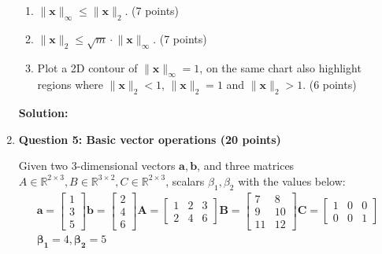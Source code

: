 \documentclass[11pt,letterpaper]{article}
\begin{document}
\begin{enumerate}
\begin{enumerate}
    \item $\lVert \mathbf{x} \rVert_\infty \le \lVert \mathbf{x} \rVert_2$. (7 points)
    \item $\lVert \mathbf{x} \rVert_2 \le \sqrt{m} \cdot \lVert \mathbf{x} \rVert_\infty$. (7 points)
    \item Plot a 2D contour of $\lVert \mathbf{x} \rVert_\infty = 1$, on the same chart also highlight regions where $\lVert \mathbf{x}\rVert_2  < 1$, $\lVert \mathbf{x}\rVert_2  = 1$ and $\lVert \mathbf{x}\rVert_2  > 1$. (6 points)
\end{enumerate}

\textbf{Solution:}

\clearpage
\item[] \textbf{Question 5: Basic vector operations (20 points)} 

Given two 3-dimensional vectors $\mathbf{a}, \mathbf{b}$, and three matrices $A \in \mathbb{R}^{2 \times 3}, B \in \mathbb{R}^{3 \times 2}, C \in \mathbb{R}^{2 \times 3}$, scalars $\beta_1, \beta_2$ with the values below:\\

\begin{gather*}
    \mathbf{a} = \begin{bmatrix} 1 \\ 3 \\ 5 \end{bmatrix} 
    \mathbf{b} = \begin{bmatrix} 2 \\ 4 \\ 6 \end{bmatrix} 
    \mathbf{A} = \begin{bmatrix} 1 & 2 & 3 \\ 2 & 4 & 6 \end{bmatrix} 
    \mathbf{B} = \begin{bmatrix} 7 & 8 \\ 9 & 10 \\ 11 & 12 \end{bmatrix} 
    \mathbf{C} = \begin{bmatrix} 1 & 0 & 0 \\ 0 & 0 & 1 \end{bmatrix} \\
    \mathbf{\beta_1} = 4, \mathbf{\beta_2} = 5
\end{gather*}




\end{enumerate}
\end{document}
